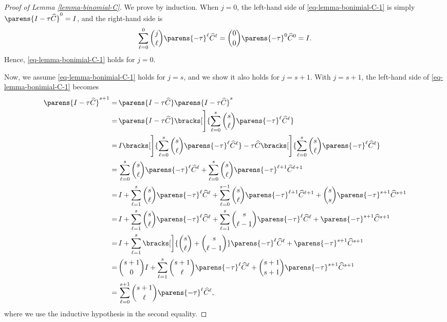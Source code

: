 \begin{proof}[Proof of Lemma \ref{lemma-binomial-C}]
	We prove by induction. When $j = 0$, the left-hand side of \eqref{eq-lemma-bonimial-C-1} is simply $\parens{I - \tau \widehat{C}}^0 = I$, and the right-hand side is 
	\begin{align*}
		\sum_{\ell=0}^0 {j \choose \ell} \parens{-\tau}^{\ell} \widehat{C}^{\ell} = {0 \choose 0} \parens{-\tau}^{0} \widehat{C}^{0} = I. 
	\end{align*}
	Hence, \eqref{eq-lemma-bonimial-C-1} holds for $j = 0$. 
	
	Now, we assume \eqref{eq-lemma-bonimial-C-1} holds for $j = s$, and we show it also holds for $j = s + 1$. With $j = s+1$, the left-hand side of \eqref{eq-lemma-bonimial-C-1} becomes 
	\begin{align*}
		\parens{I - \tau \widehat{C}}^{s+1} = & \, \parens{I - \tau \widehat{C}} \parens{I - \tau \widehat{C}}^{s} \\ 
		= & \, \parens{I - \tau \widehat{C}} \bracks[\Bigg]{\sum_{\ell=0}^s {s \choose \ell} \parens{-\tau}^{\ell} \widehat{C}^{\ell} } \\ 
		= & \, I \bracks[\Bigg]{\sum_{\ell=0}^s {s \choose \ell} \parens{-\tau}^{\ell} \widehat{C}^{\ell} } - \tau \widehat{C} \bracks[\Bigg]{\sum_{\ell=0}^s {s \choose \ell} \parens{-\tau}^{\ell} \widehat{C}^{\ell} } \\ 
		= & \, \sum_{\ell=0}^s {s \choose \ell} \parens{-\tau}^{\ell} \widehat{C}^{\ell} + \sum_{\ell=0}^s {s \choose \ell} \parens{-\tau}^{\ell + 1} \widehat{C}^{\ell + 1} \\ 
		= & \, I + \sum_{\ell=1}^s {s \choose \ell} \parens{-\tau}^{\ell} \widehat{C}^{\ell} + \sum_{\ell=0}^{s-1} {s \choose \ell} \parens{-\tau}^{\ell + 1} \widehat{C}^{\ell + 1} + {s \choose s} \parens{-\tau}^{s+1} \widehat{C}^{s + 1} \\ 
		= & \, I + \sum_{\ell=1}^s {s \choose \ell} \parens{-\tau}^{\ell} \widehat{C}^{\ell} + \sum_{\ell=1}^{s} {s \choose \ell-1} \parens{-\tau}^{\ell} \widehat{C}^{\ell} + \parens{-\tau}^{s+1} \widehat{C}^{s + 1} \\ 
		= & \, I + \sum_{\ell=1}^s \bracks[\bigg]{{s \choose \ell} + {s \choose \ell-1}} \parens{-\tau}^{\ell} \widehat{C}^{\ell} + \parens{-\tau}^{s+1} \widehat{C}^{s + 1} \\ 
		= & \, {s+1 \choose 0} I + \sum_{\ell=1}^s {s+1 \choose \ell} \parens{-\tau}^{\ell} \widehat{C}^{\ell} + {s+1 \choose s+1} \parens{-\tau}^{s+1} \widehat{C}^{s + 1} \\ 
		= & \, \sum_{\ell=0}^{s+1} {s+1 \choose \ell} \parens{-\tau}^{\ell} \widehat{C}^{\ell}, 
	\end{align*}
	where we use the inductive hypothesis in the second equality. 
\end{proof}


